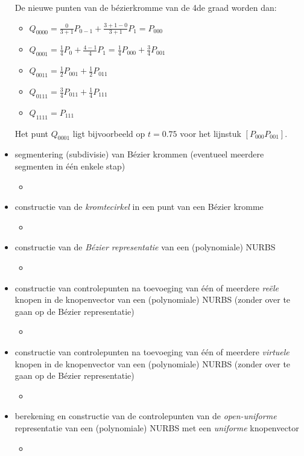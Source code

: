 \documentclass{report}
\newcommand{\vraag}[2]{
	\item #1
	
	#2
}
\begin{document}
\begin{itemize}
{\begin{itemize}
			De nieuwe punten van de bézierkromme van de 4de graad worden dan:
			\begin{itemize}
				\item $Q_{0000} = \frac{0}{3 + 1}P_{0 - 1} + \frac{3 + 1 - 0}{3 + 1}P_{1} = P_{000}$
				\item $Q_{0001} = \frac{1}{4}P_{0} + \frac{4 - 1}{4}P_{1} = \frac{1}{4}P_{000} + \frac{3}{4}P_{001}$
				\item $Q_{0011} = \frac{1}{2}P_{001} + \frac{1}{2}P_{011}$
				\item $Q_{0111} = \frac{3}{4}P_{011} + \frac{1}{4}P_{111}$
				\item $Q_{1111} = P_{111}$
			\end{itemize}
		Het punt $Q_{0001}$ ligt bijvoorbeeld op $t = 0.75$ voor het lijnstuk $[P_{000}P_{001}]$.
		\end{itemize}}
		\vraag{ segmentering (subdivisie) van Bézier krommen (eventueel meerdere segmenten in één enkele stap)}{\begin{itemize} \item {} \end{itemize}}
		\vraag{ constructie van de \textit{kromtecirkel} in een punt van een Bézier kromme}{\begin{itemize} \item {} \end{itemize}}
		\vraag{ constructie van de \textit{Bézier representatie} van een (polynomiale) NURBS}{\begin{itemize} \item {} \end{itemize}}
		\vraag{ constructie van controlepunten na toevoeging van één of meerdere \textit{reële} knopen in de knopenvector van een (polynomiale) NURBS (zonder over te gaan op de Bézier representatie)}{\begin{itemize} \item {} \end{itemize}}
		\vraag{ constructie van controlepunten na toevoeging van één of meerdere \textit{virtuele} knopen in de knopenvector van een (polynomiale) NURBS (zonder over te gaan op de Bézier representatie)}{\begin{itemize} \item {} \end{itemize}}
		\vraag{ berekening en constructie van de controlepunten van de \textit{open-uniforme} representatie van een (polynomiale) NURBS met een \textit{uniforme} knopenvector}{\begin{itemize} \item \todo{oplossen} \end{itemize}}

\end{itemize}
\end{document}
